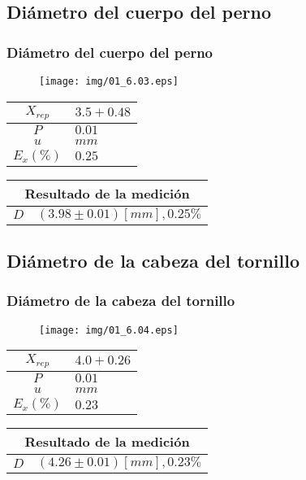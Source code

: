 \documentclass[letter,11pt]{beamer}
\begin{document}
\subsection{Diámetro del cuerpo del perno}
\begin{frame}
\frametitle{Diámetro del cuerpo del perno}
\vspace*{0.8cm}
\begin{figure}
\centering
\texttt{[image: img/01\_6.03.eps]}
\end{figure}
\vspace*{0.4cm}
\scriptsize
\begin{tabular}{|c|>{\centering}m{1.8cm}<{\centering}|}
\hline
$X_{rep}$ &  $3.5+0.48$ \tabularnewline \hline
      $P$ &      $0.01$ \tabularnewline \hline
      $u$ &        $mm$ \tabularnewline \hline
$E_x(\%)$ &      $0.25$ \tabularnewline \hline
\end{tabular}
\quad
\begin{tabular}{|c|>{\centering}m{5.7cm}<{\centering}|}
\hline
\multicolumn{2}{|c|}{\textbf{Resultado de la medición}} \\ \hline
$D$ & $( 3.98\pm0.01)[mm], 0.25\%$ \tabularnewline \hline
\end{tabular}
\end{frame}

\subsection{Diámetro de la cabeza del tornillo}
\begin{frame}
\frametitle{Diámetro de la cabeza del tornillo}
\vspace*{0.8cm}
\begin{figure}
\centering
\texttt{[image: img/01\_6.04.eps]}
\end{figure}
\vspace*{0.4cm}
\scriptsize
\begin{tabular}{|c|>{\centering}m{1.8cm}<{\centering}|}
\hline
$X_{rep}$ &  $4.0+0.26$ \tabularnewline \hline
      $P$ &      $0.01$ \tabularnewline \hline
      $u$ &        $mm$ \tabularnewline \hline
$E_x(\%)$ &      $0.23$ \tabularnewline \hline
\end{tabular}
\quad
\begin{tabular}{|c|>{\centering}m{5.7cm}<{\centering}|}
\hline
\multicolumn{2}{|c|}{\textbf{Resultado de la medición}} \\ \hline
$D$ & $( 4.26\pm0.01)[mm], 0.23\%$ \tabularnewline \hline
\end{tabular}
\end{frame}
\end{document}
